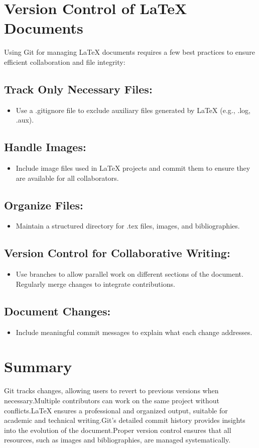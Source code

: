 \documentclass{article}
\begin{document}
\section{Version Control of LaTeX Documents}
Using Git for managing LaTeX documents requires a few best practices to ensure efficient collaboration and file integrity:
\subsection{Track Only Necessary Files:}
\begin{itemize}
    \item Use a .gitignore file to exclude auxiliary files generated by LaTeX (e.g., .log, .aux).
\end{itemize}
\subsection{Handle Images:}
\begin{itemize}
    \item 
Include image files used in LaTeX projects and commit them to ensure they are available for all collaborators.
\end{itemize}
\subsection{Organize Files:}
\begin{itemize}
    \item Maintain a structured directory for .tex files, images, and bibliographies.
\end{itemize}
\subsection{Version Control for Collaborative Writing:}
\begin{itemize}
    \item 
Use branches to allow parallel work on different sections of the document.
Regularly merge changes to integrate contributions.
\end{itemize}
\subsection{Document Changes:}
\begin{itemize}
    \item Include meaningful commit messages to explain what each change addresses.
\end{itemize}



\section{Summary}
Git tracks changes, allowing users to revert to previous versions when necessary.Multiple contributors can work on the same project without conflicts.LaTeX ensures a professional and organized output, suitable for academic and technical writing.Git's detailed commit history provides insights into the evolution of the document.Proper version control ensures that all resources, such as images and bibliographies, are managed systematically.
\end{document}
